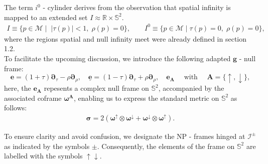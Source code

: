 The term $i^0$ - cylinder derives from the observation that spatial infinity is mapped to an extended set $I \approx \mathbb{R}\times \mathbb{S}^2$.
\begin{align*}
I \equiv \{ p \in \mathcal{M} \; \rvert \;\; |\tau(p)|<1, \;\rho(p)=0\}, \qquad I^{0} \equiv \{ p \in \mathcal{M}\; \rvert \;\tau(p)=0, \; \rho(p)=0\},
\end{align*}
where the regions spatial and null infinity meet were already defined in section 1.2.\\
To facilitate the upcoming discussion, we introduce the following adapted $\boldsymbol{g}$ - null frame:
\begin{equation}\label{eq:Fframe}
\boldsymbol{e}=(1+\tau) \boldsymbol{\partial}_\tau-\rho \boldsymbol{\partial}_\rho, \quad \underline{\boldsymbol{e}}=(1-\tau) \boldsymbol{\partial}_\tau+\rho \boldsymbol{\partial}_\rho, \quad \boldsymbol{e}_{\boldsymbol{A}} \quad \text { with } \quad \boldsymbol{A}=\{\uparrow, \downarrow\},
\end{equation}
here, the $\boldsymbol{e}_{\boldsymbol{A}}$ repesents a complex null frame on $\mathbb{S}^2$, accompanied by the associated coframe $\boldsymbol{\omega}^{\boldsymbol{A}}$, enabling us to express the standard metric on $\mathbb{S}^2$ as follows:
\begin{align}
\bm\sigma=2(\bm\omega^{\uparrow}\otimes \bm\omega^{\downarrow}+\bm\omega^{\downarrow}\otimes \bm\omega^{\uparrow}).
\end{align}
\begin{remark}
  To ensure clarity and avoid confusion, we designate the NP - frames hinged at $\mathscr{I}^{\pm}$ as indicated by the symbols $\pm$. Consequently, the elements of the frame on $\mathbb{S}^2$ are labelled with the symbols $\uparrow \downarrow$.
\end{remark}

